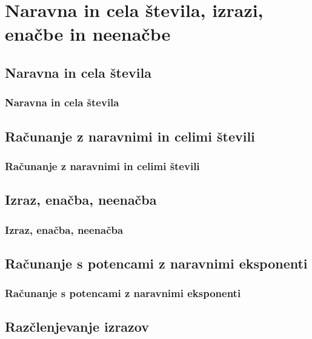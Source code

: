 \section{Naravna in cela števila, izrazi, enačbe in neenačbe}

        \begin{frame}
            \sectionpage
        \end{frame}

        \begin{frame}
        \end{frame}
        
    \subsection{Naravna in cela števila}

        \begin{frame}
            \frametitle{Naravna in cela števila}
        \end{frame}

    \subsection{Računanje z naravnimi in celimi števili}

        \begin{frame}
            \frametitle{Računanje z naravnimi in celimi števili}
        \end{frame}

    \subsection{Izraz, enačba, neenačba}

        \begin{frame}
            \frametitle{Izraz, enačba, neenačba}
        \end{frame}

    \subsection{Računanje s potencami z naravnimi eksponenti}

        \begin{frame}
            \frametitle{Računanje s potencami z naravnimi eksponenti}
        \end{frame}

    \subsection{Razčlenjevanje izrazov}

